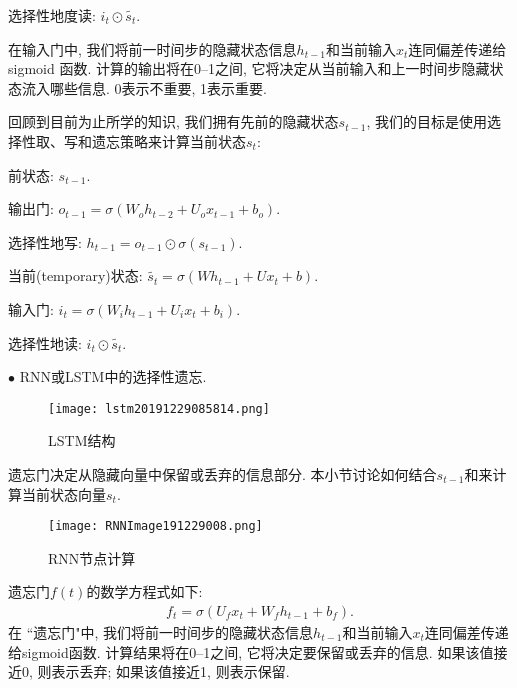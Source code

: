 \begin{example}
\quad\quad 选择性地度读: $i_{t} \odot \tilde{s_{t}}$.

在输入门中, 我们将前一时间步的隐藏状态信息$h_{t-1}$和当前输入$x_t$连同偏差传递给 sigmoid 函数.
计算的输出将在0–1之间, 它将决定从当前输入和上一时间步隐藏状态流入哪些信息. 0表示不重要, 1表示重要.

回顾到目前为止所学的知识, 我们拥有先前的隐藏状态$s_{t-1}$, 我们的目标是使用选择性取、写和遗忘策略来计算当前状态$s_t$:

\quad\quad 前状态: $s_{t-1}$.

\quad\quad 输出门: $o_{t-1}=\sigma\left (W_{o} h_{t-2}+U_{o} x_{t-1}+b_{o}\right)$.

\quad\quad 选择性地写: $h_{t-1}=o_{t-1} \odot \sigma\left (s_{t-1}\right)$.

\quad\quad 当前(temporary)状态: $\tilde{s_{t}}=\sigma\left (W h_{t-1}+U x_{t}+b\right)$.

\quad\quad 输入门: $i_{t}=\sigma\left (W_{i} h_{t-1}+U_{i} x_{t}+b_{i}\right)$.

\quad 选择性地读: $i_{t} \odot \tilde{s_{t}}$.
\end{example}
$\bullet$ RNN或LSTM中的选择性遗忘.

\begin{figure}[H]
    \centering
    \texttt{[image: lstm20191229085814.png]}
    \caption{LSTM结构}
    \label{lstm20191229085814}
    \vspace{-0.4cm}
\end{figure}

遗忘门决定从隐藏向量中保留或丢弃的信息部分. 本小节讨论如何结合$s_{t-1}$和来计算当前状态向量$s_t$.
\begin{figure}[H]
    \centering
    \texttt{[image: RNNImage191229008.png]}
    \caption{RNN节点计算}
    \label{RNNImage191229008}\vspace{-0.4cm}
\end{figure}

遗忘门$f (t)$的数学方程式如下:
\begin{align}
    f_{t}=\sigma\left (U_{f} x_{t}+W_{f} h_{t-1}+b_{f}\right).
\end{align}
在 ``遗忘门"中, 我们将前一时间步的隐藏状态信息$h_{t-1}$和当前输入$x_t$连同偏差传递给sigmoid函数.
计算结果将在0–1之间, 它将决定要保留或丢弃的信息.
如果该值接近0, 则表示丢弃; 如果该值接近1, 则表示保留.

